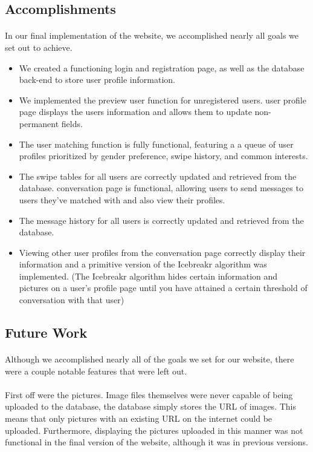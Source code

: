 \documentclass{article}
\begin{document}
    \subsection{Accomplishments}
    \paragraph{}
    In our final implementation of the website, we accomplished nearly all goals we set out to achieve.
    \begin{itemize}
    \item We created a functioning login and registration page, as well as the database back-end to store user profile information.
    \item We implemented the preview user function for unregistered users.
    \itemThe user profile page displays the users information and allows them to update non-permanent fields.
    \item The user matching function is fully functional, featuring a a queue of user profiles prioritized by gender preference, swipe history, and common interests.
    \item The swipe tables for all users are correctly updated and retrieved from the database.
    \itemThe conversation page is functional, allowing users to send messages to users they've matched with and also view their profiles.
    \item The message history for all users is correctly updated and retrieved from the database.
    \item Viewing other user profiles from the conversation page correctly display their information and a primitive version of the Icebreakr algorithm was implemented. (The Icebreakr algorithm hides certain information and pictures on a user's profile page until you have attained a certain threshold of conversation with that user)
    \end{itemize}
    \subsection{Future Work}
    \paragraph{}
    Although we accomplished nearly all of the goals we set for our website, there were a couple notable features that were left out.
    \paragraph{}First off were the pictures. Image files themselves were never capable of being uploaded to the database, the database simply stores the URL of images. This means that only pictures with an existing URL on the internet could be uploaded. Furthermore, displaying the pictures uploaded in this manner was not functional in the final version of the website, although it was in previous versions.
\end{document}

